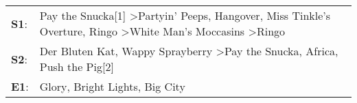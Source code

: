 \begin{supertabular}{p{0.03\textwidth}p{0.92\textwidth}}
 \textbf{S1}:  &  Pay the Snucka[1]\textsuperscript{} \textgreater \enspace Partyin' Peeps\textsuperscript{}, \enspace Hangover\textsuperscript{}, \enspace Miss Tinkle's Overture\textsuperscript{}, \enspace Ringo\textsuperscript{} \textgreater \enspace White Man's Moccasins\textsuperscript{} \textgreater \enspace Ringo\textsuperscript{}  \enspace  \\
 \textbf{S2}:  &                                                                                                               Der Bluten Kat\textsuperscript{}, \enspace Wappy Sprayberry\textsuperscript{} \textgreater \enspace Pay the Snucka\textsuperscript{}, \enspace Africa\textsuperscript{}, \enspace Push the Pig[2]\textsuperscript{}  \enspace  \\
 \textbf{E1}:  &                                                                                                                                                                                                                                                       Glory\textsuperscript{}, \enspace Bright Lights, Big City\textsuperscript{}  \enspace  \\
\end{supertabular}
